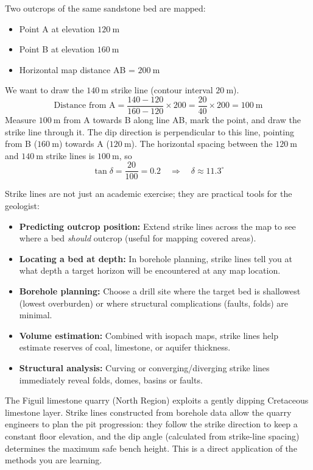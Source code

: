 \documentclass[11pt]{article}
\newcounter{popsec}
\newcounter{popsub}
\newcommand{\courssub}[1]{%
  \stepcounter{popsub}%
  \par\vspace{9pt}\noindent{\popxbold\fontsize{11.5}{13}\selectfont\color{popink}{\color{poporange}\thepopsec.\thepopsub}\hspace{6pt}#1}\par\nopagebreak\vspace{4pt}
}
\begin{document}
\begin{exemplebox}
Two outcrops of the same sandstone bed are mapped:
\begin{itemize}
\item Point A at elevation $120\ \mathrm{m}$
\item Point B at elevation $160\ \mathrm{m}$
\item Horizontal map distance AB = $200\ \mathrm{m}$
\end{itemize}
We want to draw the $140\ \mathrm{m}$ strike line (contour interval $20\ \mathrm{m}$).
\[
\text{Distance from A} = \frac{140-120}{160-120} \times 200 = \frac{20}{40} \times 200 = 100\ \mathrm{m}
\]
Measure $100\ \mathrm{m}$ from A towards B along line AB, mark the point, and draw the strike line through it. The dip direction is perpendicular to this line, pointing from B ($160\ \mathrm{m}$) towards A ($120\ \mathrm{m}$). The horizontal spacing between the $120\ \mathrm{m}$ and $140\ \mathrm{m}$ strike lines is $100\ \mathrm{m}$, so
\[
\tan\delta = \frac{20}{100} = 0.2 \quad\Rightarrow\quad \delta \approx 11.3^\circ
\]
\end{exemplebox}

\courssub{Uses of Strike Lines}

Strike lines are not just an academic exercise; they are practical tools for the geologist:

\begin{itemize}
\item \textbf{Predicting outcrop position:} Extend strike lines across the map to see where a bed \emph{should} outcrop (useful for mapping covered areas).
\item \textbf{Locating a bed at depth:} In borehole planning, strike lines tell you at what depth a target horizon will be encountered at any map location.
\item \textbf{Borehole planning:} Choose a drill site where the target bed is shallowest (lowest overburden) or where structural complications (faults, folds) are minimal.
\item \textbf{Volume estimation:} Combined with isopach maps, strike lines help estimate reserves of coal, limestone, or aquifer thickness.
\item \textbf{Structural analysis:} Curving or converging/diverging strike lines immediately reveal folds, domes, basins or faults.
\end{itemize}

\begin{savaistu}
The Figuil limestone quarry (North Region) exploits a gently dipping Cretaceous limestone layer. Strike lines constructed from borehole data allow the quarry engineers to plan the pit progression: they follow the strike direction to keep a constant floor elevation, and the dip angle (calculated from strike‑line spacing) determines the maximum safe bench height. This is a direct application of the methods you are learning.
\end{savaistu}
\end{document}
